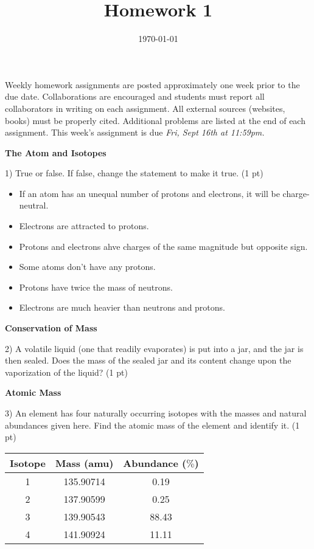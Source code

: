 \documentclass[12pt]{article}
\title{\textbf{Homework 1}}
\date{\vspace{-2em}\today}
\begin{document}
\maketitle 

Weekly homework assignments are posted approximately one week prior to the
due date. Collaborations are encouraged and students must report all collaborators
in writing on each assignment. All external sources (websites, books) must be
properly cited. Additional problems are listed at the end of each assignment.
This week's assignment is due \textit{Fri, Sept 16th at 11:59pm.}

\textbf{The Atom and Isotopes}

1) True or false. If false, change the statement to make it true. (1 pt)

\begin{itemize}
\item If an atom has an unequal number of protons and electrons, it will be
  charge-neutral.
\item Electrons are attracted to protons.
\item Protons and electrons ahve charges of the same magnitude but opposite
  sign.
\item Some atoms don't have any protons.
\item Protons have twice the mass of neutrons.
\item Electrons are much heavier than neutrons and protons.
\end{itemize}

\vspace{1in}

\textbf{Conservation of Mass}

2) A volatile liquid (one that readily evaporates) is put into a jar, and the
jar is then sealed. Does the mass of the sealed jar and its content change
upon the vaporization of the liquid? (1 pt)

\pagebreak

\textbf{Atomic Mass}

3) An element has four naturally occurring isotopes with the masses and natural
abundances given here. Find the atomic mass of the element and identify it. (1 pt)
\begin{table}[hbpt]
  \begin{tabular}{ccc}
    Isotope & Mass (amu) & Abundance ($\%$) \\
    \hline
    1 & 135.90714 & 0.19 \\
    2 & 137.90599 & 0.25 \\
    3 & 139.90543 & 88.43\\
    4 & 141.90924 & 11.11
  \end{tabular}
\end{table}
\end{document}
